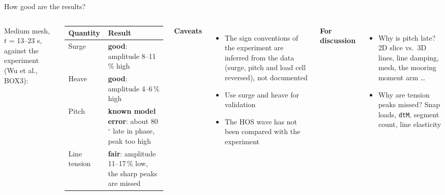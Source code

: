 \documentclass[aspectratio=169,10pt]{beamer}
\begin{document}
\begin{frame}{How good are the results?}
  \begin{columns}[T]
    \small
    Medium mesh, $t$ = 13--23 s, against the experiment (Wu et al., BOX3):

    \vspace{2mm}
    \renewcommand{\arraystretch}{1.3}
    \begin{tabularx}{\linewidth}{@{}P{2.2cm}L@{}}
      \toprule
      Quantity & Result \\
      \midrule
      Surge & {\leavevmode\color{sea}\bfseries good}: amplitude 8--11\,\% high \\
      Heave & {\leavevmode\color{sea}\bfseries good}: amplitude 4--6\,\% high \\
      Pitch & {\leavevmode\color{coral}\bfseries known model error}: about 80$^\circ$ late in phase, peak too high \\
      Line tension & {\leavevmode\color{sand!80!black}\bfseries fair}: amplitude 11--17\,\% low, the sharp peaks are missed \\
      \bottomrule
    \end{tabularx}
    \small
    \textbf{Caveats}
    \begin{itemize}
      \item The sign conventions of the experiment are inferred from the data (surge, pitch and load
            cell reversed), not documented
      \item Use surge and heave for validation
      \item The HOS wave has not been compared with the experiment
    \end{itemize}
    \textbf{For discussion}
    \begin{itemize}
      \item Why is pitch late? 2D slice vs.\ 3D lines, line damping, mesh, the mooring
            moment arm \dots
      \item Why are tension peaks missed? Snap loads, \texttt{dtM}, segment count, line
            elasticity
    \end{itemize}
  \end{columns}
\end{frame}
\end{document}
